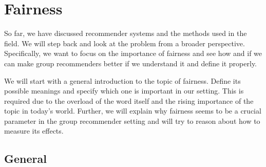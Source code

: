 \chapter{Fairness} \label{chap:fairness}

So far, we have discussed recommender systems and the methods used in the field. We will step back and look at the problem from a broader perspective. Specifically, we want to focus on the importance of fairness and see how and if we can make group recommenders better if we understand it and define it properly.

We will start with a general introduction to the topic of fairness. Define its possible meanings and specify which one is important in our setting. This is required due to the overload of the word itself and the rising importance of the topic in today's world. Further, we will explain why fairness seems to be a crucial parameter in the group recommender setting and will try to reason about how to measure its effects.







\section{General} \label{sec:02_general}




